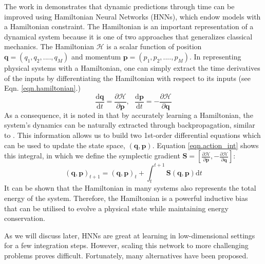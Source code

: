 \documentclass{article}
\begin{document}
The work in \cite{greydanus_hamiltonian_2019} demonstrates that dynamic predictions through time can be improved using Hamiltonian Neural Networks (HNNs), which endow models with a Hamiltonian constraint. The Hamiltonian is an important representation of a dynamical system because it is one of two approaches that generalizes classical mechanics. The Hamiltonian $\mathcal{H}$ is a scalar function of position $\mathbf{q} = (q_1,q_2,....,q_M)$ and momentum $\mathbf{p} = (p_1,p_2,....,p_M)$. In representing physical systems with a Hamiltonian, one can simply extract the time derivatives of the inputs by differentiating the Hamiltonian with respect to its inputs (see Eqn. \ref{eqn.hamiltonian}.)
\begin{equation}
\frac{\mathrm{d}\mathbf{q}}{\mathrm{d}t} = \frac{\partial \mathcal{H}}{\partial \mathbf{p}}, ~~~
\frac{\mathrm{d}\mathbf{p}}{\mathrm{d}t} = -\frac{\partial \mathcal{H}}{\partial \mathbf{q}}
\label{eqn.hamiltonian}
\end{equation}
As a consequence, it is noted in \cite{greydanus_hamiltonian_2019} that by accurately learning a Hamiltonian, the system's dynamics can be naturally extracted through backpropagation, similar to \cite{raissi_physics-informed_2019}. This information allows us to build two 1st-order differential equations which can be used to update the state space, $(\mathbf{q},\mathbf{p})$. Equation \ref{eqn.action_int} shows this integral, in which we define the symplectic gradient $\mathbf{S}  = \left [ \frac{\partial \mathcal{H}}{\partial \mathbf{p}},-\frac{\partial \mathcal{H}}{\partial \mathbf{q}} \right ] $:
\begin{equation}
(\mathbf{q},\mathbf{p})_{t+1} = (\mathbf{q},\mathbf{p})_t + \int_t^{t+1} \mathbf{S}(\mathbf{q},\mathbf{p}) \mathrm{d}t
\label{eqn.action_int}
\end{equation}
It can be shown that the Hamiltonian in many systems also represents the total energy of the system. Therefore, the Hamiltonian is a powerful inductive bias that can be utilised to evolve a physical state while maintaining energy conservation.

As we will discuss later, HNNs are great at learning in low-dimensional settings for a few integration steps. However, scaling this network to more challenging problems proves difficult. Fortunately, many alternatives have been proposed. 
\end{document}
